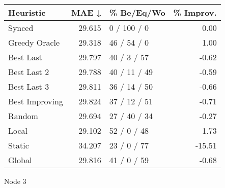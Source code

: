 \begin{tabular}{lrlr}
\toprule
\textbf{Heuristic} & \textbf{MAE ↓} & \textbf{\% Be/Eq/Wo} & \textbf{\% Improv.} \\
\midrule
            Synced &         29.615 &          0 / 100 / 0 &                0.00 \\
     Greedy Oracle &         29.318 &          46 / 54 / 0 &                1.00 \\
         Best Last &         29.797 &          40 / 3 / 57 &               -0.62 \\
       Best Last 2 &         29.788 &         40 / 11 / 49 &               -0.59 \\
       Best Last 3 &         29.811 &         36 / 14 / 50 &               -0.66 \\
    Best Improving &         29.824 &         37 / 12 / 51 &               -0.71 \\
            Random &         29.694 &         27 / 40 / 34 &               -0.27 \\
             Local &         29.102 &          52 / 0 / 48 &                1.73 \\
            Static &         34.207 &          23 / 0 / 77 &              -15.51 \\
            Global &         29.816 &          41 / 0 / 59 &               -0.68 \\
\bottomrule
\end{tabular}
\caption{Node 3}
\label{tab:non_lr01_le2_bs2_3}
